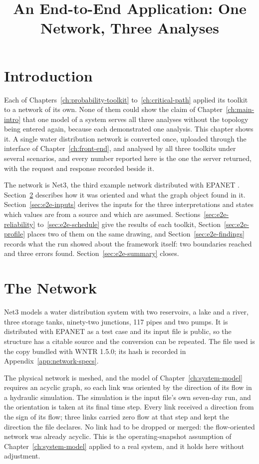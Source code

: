 \documentclass[12pt]{report}
\newcommand{\CaseStudyNetwork}{Net3}
\begin{document}
\title{An End-to-End Application: One Network, Three Analyses}
\fi

\providecommand{\PH}[1]{\textbf{[#1]}}

\section{Introduction}
\label{sec:e2e-intro}

Each of Chapters~\ref{ch:probability-toolkit} to~\ref{ch:critical-path} applied its toolkit
to a network of its own. None of them could show the claim of Chapter~\ref{ch:main-intro}
that one model of a system serves all three analyses without the topology being entered
again, because each demonstrated one analysis. This chapter shows it. A single water
distribution network is converted once, uploaded through the interface of
Chapter~\ref{ch:front-end}, and analysed by all three toolkits under several scenarios,
and every number reported here is the one the server returned, with the request and
response recorded beside it.

The network is \CaseStudyNetwork, the third example network distributed with EPANET
\cite{rossman2000epanet2}. Section~\ref{sec:e2e-network} describes how it was oriented and
what the graph object found in it. Section~\ref{sec:e2e-inputs} derives the inputs for the
three interpretations and states which values are from a source and which are assumed.
Sections~\ref{sec:e2e-reliability} to~\ref{sec:e2e-schedule} give the results of each
toolkit, Section~\ref{sec:e2e-profile} places two of them on the same drawing, and
Section~\ref{sec:e2e-findings} records what the run showed about the framework itself:
two boundaries reached and three errors found. Section~\ref{sec:e2e-summary} closes.

\section{The Network}
\label{sec:e2e-network}

\CaseStudyNetwork{} models a water distribution system with two reservoirs, a lake and a
river, three storage tanks, ninety-two junctions, 117 pipes and two pumps. It is
distributed with EPANET as a test case and its input file is public, so the structure has a
citable source and the conversion can be repeated. The file used is the copy bundled with
WNTR 1.5.0; its hash is recorded in Appendix~\ref{app:network-specs}.

The physical network is meshed, and the model of Chapter~\ref{ch:system-model} requires an
acyclic graph, so each link was oriented by the direction of its flow in a hydraulic
simulation. The simulation is the input file's own seven-day run, and the orientation is
taken at its final time step. Every link received a direction from the sign of its flow;
three links carried zero flow at that step and kept the direction the file declares. No
link had to be dropped or merged: the flow-oriented network was already acyclic. This is
the operating-snapshot assumption of Chapter~\ref{ch:system-model} applied to a real
system, and it holds here without adjustment.
\end{document}
